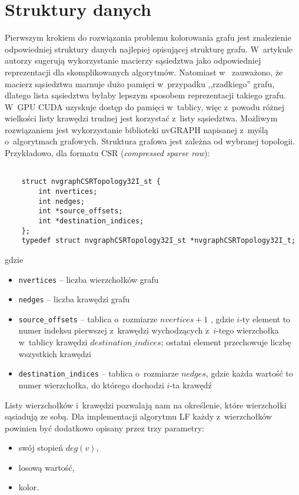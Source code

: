 \documentclass{article}
\begin{document}
	\section{Struktury danych}
	Pierwszym krokiem do rozwiązania problemu kolorowania grafu jest znalezienie odpowiedniej struktury danych najlepiej opisującej strukturę grafu. W~artykule \cite{Shen2017} autorzy sugerują wykorzystanie macierzy sąsiedztwa jako odpowiedniej reprezentacji dla skomplikowanych algorytmów. Natomiast w~\cite{SINGH20155} zauważono, że macierz sąsiedztwa marnuje dużo pamięci w~przypadku ,,rzadkiego'' grafu, dlatego lista sąsiedztwa byłaby lepszym sposobem reprezentacji takiego grafu. W~GPU CUDA uzyskuje dostęp do pamięci w~tablicy, więc z~powodu różnej wielkości listy krawędzi trudnej jest korzystać z~listy sąsiedztwa. Możliwym rozwiązaniem jest wykorzystanie biblioteki nvGRAPH \cite{nvgraph} napisanej z~myślą o~algorytmach grafowych. Struktura grafowa jest zależna od wybranej topologii. Przykładowo, dla formatu CSR (\textit{compressed sparse row}):
	\begin{lstlisting}[caption={Struktura formatu CSR z biblioteki nvGRAPH.}]
	
	struct nvgraphCSRTopology32I_st {
		int nvertices;
		int nedges;
		int *source_offsets;
		int *destination_indices;
	};
	typedef struct nvgraphCSRTopology32I_st *nvgraphCSRTopology32I_t;
	\end{lstlisting}
	gdzie
	\begin{itemize}
		\itemsep0em
		\item \texttt{nvertices} -- liczba wierzchołków grafu
		\item \texttt{nedges} -- liczba krawędzi grafu
		\item \texttt{source\_offsets} -- tablica o~rozmiarze $nvertices+1$ , gdzie $i$-ty element to numer indeksu pierwszej z~krawędzi wychodzących z~$i$-tego wierzchołka w~tablicy krawędzi $destination\_indices$; ostatni element przechowuje liczbę wszystkich krawędzi
		\item \texttt{destination\_indices} -- tablica o~rozmiarze $nedges$, gdzie każda wartość to numer wierzchołka, do którego dochodzi $i$-ta krawędź
	\end{itemize}
	Listy wierzchołków i~krawędzi pozwalają nam na określenie, które wierzchołki sąsiadują ze sobą. Dla implementacji algorytmu LF każdy z~wierzchołków powinien być dodatkowo opisany przez trzy parametry:
	\begin{itemize}
		\itemsep0em
		\item swój stopień $deg(v)$,
		\item losową wartość, 
		\item kolor. 
	\end{itemize}
\end{document}
